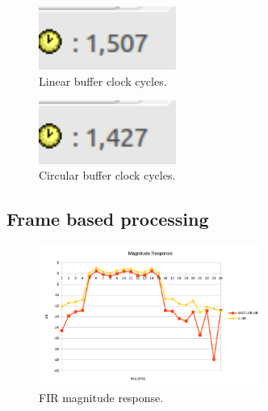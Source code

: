 \documentclass{article}
\begin{document}
\begin{figure}[h]
  \begin{center}
    \includegraphics[width=0.4\textwidth]{img/linear_buffer.png}
    \caption{Linear buffer clock cycles.}
  \end{center}
\end{figure}

\begin{figure}[h]
  \begin{center}
    \includegraphics[width=0.4\textwidth]{img/circular_buffer.png}
    \caption{Circular buffer clock cycles.}
  \end{center}
\end{figure}

\subsection{Frame based processing}

\begin{figure}[h]
  \begin{center}
    \includegraphics[width=0.65\textwidth]{img/fir_mag.png}
    \caption{FIR magnitude response.}
  \end{center}
\end{figure}
\end{document}
